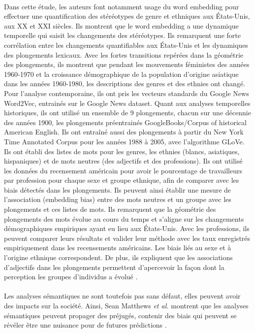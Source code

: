 \documentclass{article}
\begin{document}
\paragraph{}
Dans cette étude, les auteurs font notamment usage du word embedding pour effectuer une quantification des stéréotypes de genre et ethniques aux États-Unis, aux XX et XXI siècles. Ils montrent que le word embedding a une dynamique temporelle qui saisit les changements des stéréotypes. Ils remarquent une forte corrélation entre les changements quantifiables aux États-Unis et les dynamiques des plongements lexicaux. Avec les fortes transitions repérées dans la géométrie des plongements, ils montrent que pendant les mouvements féministes des années 1960-1970 et la croissance démographique de la population d’origine asiatique dans les années 1960-1980, les descriptions des genres et des ethnies ont changé. Pour l’analyse contemporaine, ils ont pris les vecteurs standards du Google News Word2Vec, entrainés sur le Google News dataset. Quant aux analyses temporelles historiques, ils ont utilisé un ensemble de 9 plongements, chacun sur une décennie des années 1900, les plongements préentrainés GoogleBooks/Corpus of historical American English. Ils ont entraîné aussi des plongements à partir du New York Time Annotated Corpus pour les années 1988 à 2005, avec l’algorithme GLoVe. Ils ont établi des listes de mots pour les genres, les ethnies (blancs, asiatiques, hispaniques) et de mots neutres (des adjectifs et des professions). Ils ont utilisé les données du recensement américain pour avoir le pourcentage de travailleurs par profession pour chaque sexe et groupe ethnique, afin de comparer avec les biais détectés dans les plongements. Ils peuvent ainsi établir une mesure de l’association (embedding bias) entre des mots neutres et un groupe avec les plongements et ces listes de mots. Ils remarquent que la géométrie des plongements des mots évolue au cours du temps et s’aligne sur les changements démographiques empiriques ayant eu lieu aux États-Unis. Avec les professions, ils peuvent comparer leurs résultats et valider leur méthode avec les taux enregistrés empiriquement dans les recensements américains. Les biais liés au sexe et à l’origine ethnique correspondent. De plus, ils expliquent que les associations d’adjectifs dans les plongements permettent d’apercevoir la façon dont la perception les groupes d’individus a évolué \cite{garg2018word}.
\paragraph{}
Les analyses sémantiques ne sont toutefois pas sans défaut, elles peuvent avoir des impacts sur la société. Ainsi, Sean Matthews \textit{et al.} montrent que les analyses sémantiques peuvent propager des préjugés, contenir des biais qui peuvent se révéler être une nuisance pour de futures prédictions \cite{matthews2022gender}. 
\end{document}
